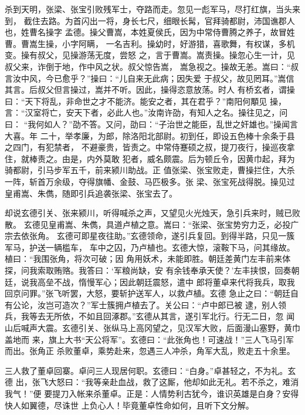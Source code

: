 杀到天明，张梁、张宝引败残军士，夺路而走。忽见一彪军马，尽打红旗，当头来到，
截住去路。为首闪出一将，身长七尺，细眼长髯，官拜骑都尉，沛国谯郡人也，姓曹名操字
孟德。操父曹嵩，本姓夏侯氏，因为中常侍曹腾之养子，故冒姓曹。曹嵩生操，小字阿瞒，
一名吉利。操幼时，好游猎，喜歌舞，有权谋，多机变。操有叔父，见操游荡无度，尝怒
之，言于曹嵩。嵩责操。操忽心生一计，见叔父来，诈倒于地，作中风之状。叔父惊告嵩，
嵩急视之。操故无恙。嵩曰：“叔言汝中风，今已愈乎？”操曰：“儿自来无此病；因失爱
于叔父，故见罔耳。”嵩信其言。后叔父但言操过，嵩并不听。因此，操得恣意放荡。时人
有桥玄者，谓操曰：“天下将乱，非命世之才不能济。能安之者，其在君乎？”南阳何顒见
操，言：“汉室将亡，安天下者，必此人也。”汝南许劭，有知人之名。操往见之，问曰：
“我何如人？”劭不答。又问，劭曰：“子治世之能臣，乱世之奸雄也。”操闻言大喜。年
二十，举孝廉，为郎，除洛阳北部尉。初到任，即设五色棒十余条于县之四门，有犯禁者，
不避豪贵，皆责之。中常侍蹇硕之叔，提刀夜行，操巡夜拿住，就棒责之。由是，内外莫敢
犯者，威名颇震。后为顿丘令，因黄巾起，拜为骑都尉，引马步军五千，前来颍川助战。正
值张梁、张宝败走，曹操拦住，大杀一阵，斩首万余级，夺得旗幡、金鼓、马匹极多。张
梁、张宝死战得脱。操见过皇甫嵩、朱儁，随即引兵追袭张梁、张宝去了。

却说玄德引关、张来颍川，听得喊杀之声，又望见火光烛天，急引兵来时，贼已败散。
玄德见皇甫嵩、朱儁，具道卢植之意。嵩曰：“张梁、张宝势穷力乏，必投广宗去依张角。
玄德可即星夜往助。”玄德领命，遂引兵复回。到得半路，只见一簇军马，护送一辆槛车，
车中之囚，乃卢植也。玄德大惊，滚鞍下马，问其缘故。植曰：“我围张角，将次可破；因
角用妖术，未能即胜。朝廷差黄门左丰前来体探，问我索取贿赂。我答曰：‘军粮尚缺，安
有余钱奉承天使？’左丰挟恨，回奏朝廷，说我高垒不战，惰慢军心；因此朝廷震怒，遣中
郎将董卓来代将我兵，取我回京问罪。”张飞听罢，大怒，要斩护送军人，以救卢植。玄德
急止之曰：“朝廷自有公论，汝岂可造次？”军士簇拥卢植去了。关公曰：“卢中郎已被
逮，别人领兵，我等去无所依，不如且回涿郡。”玄德从其言，遂引军北行。行无二日，忽
闻山后喊声大震。玄德引关、张纵马上高冈望之，见汉军大败，后面漫山塞野，黄巾盖地而
来，旗上大书“天公将军”。玄德曰：“此张角也！可速战！”三人飞马引军而出。张角正
杀败董卓，乘势赴来，忽遇三人冲杀，角军大乱，败走五十余里。

三人救了董卓回寨。卓问三人现居何职。玄德曰：“白身。”卓甚轻之，不为礼。玄德
出，张飞大怒曰：“我等亲赴血战，救了这厮，他却如此无礼。若不杀之，难消我气！”便
要提刀入帐来杀董卓。正是：人情势利古犹今，谁识英雄是白身？安得快人如翼德，尽诛世
上负心人！毕竟董卓性命如何，且听下文分解。
